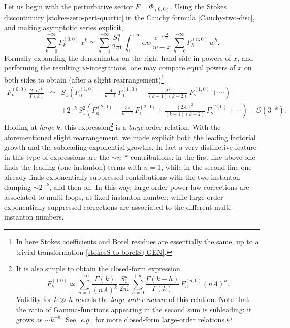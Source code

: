 \documentclass[11pt,a4paper]{article}
\newcommand{\be}{\begin{equation}}
\newcommand{\ee}{\end{equation}}
\newcommand{\rme}{{\mathrm{e}}}
\newcommand{\rmi}{{\mathrm{i}}}
\newcommand{\rmd}{{\mathrm{d}}}
\begin{document}
Let us begin with the perturbative sector $F=\Phi_{(0,0)}$. Using the Stokes discontinuity \eqref{stokes-zero-pert-quartic} in the Cauchy formula \eqref{Cauchy-two-disc}, and making asymptotic series explicit, 
%
\be
\sum_{k=0}^{+\infty} F_{k}^{(0,0)}\, x^k  \simeq \sum_{n=1}^{+\infty}\frac{S_1^n}{2\pi\rmi}\, \int_{0}^{+\infty} \rmd w\, \frac{\rme^{-n \frac{A}{w}}}{w-x}\, \sum_{h=0}^{+\infty} F_{h}^{(n,0)}\, w^h.
\ee
%
\noindent
Formally expanding the denominator on the right-hand-side in powers of $x$, and performing the resulting $w$-integrations, one may compare equal powers of $x$ on both sides to obtain (after a slight rearrangement)\footnote{In here Stokes coefficients and Borel residues are essentially the same, up to a trivial transformation \eqref{stokesS-to-borelS+GEN}.}
%
\begin{eqnarray}
\label{large-order-pert-quartic}
F_{k}^{(0,0)}\, \frac{2\pi\rmi A^k}{\Gamma(k)} &\simeq& S_1 \left( F_0^{(1,0)} + \frac{A}{k-1}\, F_1^{(1,0)} + \frac{A^2}{(k-1)(k-2)}\, F_2^{(1,0)} + \cdots \right) + \\
&& + 2^{-k}\, S_1^2 \left( F_0^{(2,0)} + \frac{2A}{k-1}\, F_1^{(2,0)} + \frac{(2A)^2}{(k-1)(k-2)}\, F_2^{(2,0)} + \cdots \right) + \mathcal{O}(3^{-k}). \nonumber
\end{eqnarray}
%
\noindent
Holding at \textit{large} $k$, this expression\footnote{It is also simple to obtain the closed-form expression
%
\be
F_{k}^{(0,0)} \simeq \sum_{n=1}^{+\infty} \frac{\Gamma(k)}{\left( n A \right)^k}\, \frac{S_1^n}{2\pi\rmi}\, \sum_{h=0}^{+\infty} \frac{\Gamma(k-h)}{\Gamma(k)}\, F_{h}^{(n,0)} \left( n A \right)^{h}.
\ee
%
\noindent
Validity for $k\gg h$ reveals the \textit{large-order nature} of this relation. Note that the ratio of Gamma-functions appearing in the second sum is subleading: it grows as $\sim k^{-h}$. See, \textit{e.g.}, \cite{asv11} for more closed-form large-order relations.} is a \textit{large}-order relation. With the aforementioned slight rearrangement, we made explicit both the leading factorial growth and the subleading exponential growths. In fact a very distinctive feature in this type of expressions are the $\sim n^{-k}$ contributions: in the first line above one finds the leading (one-instanton) terms with $n=1$, while in the second line one already finds exponentially-suppressed contributions with the two-instanton damping $\sim 2^{-k}$, and then on. In this way, large-order power-law corrections are associated to multi-loops, at fixed instanton number; while large-order exponentially-suppressed corrections are associated to the different multi-instanton numbers.
\end{document}
